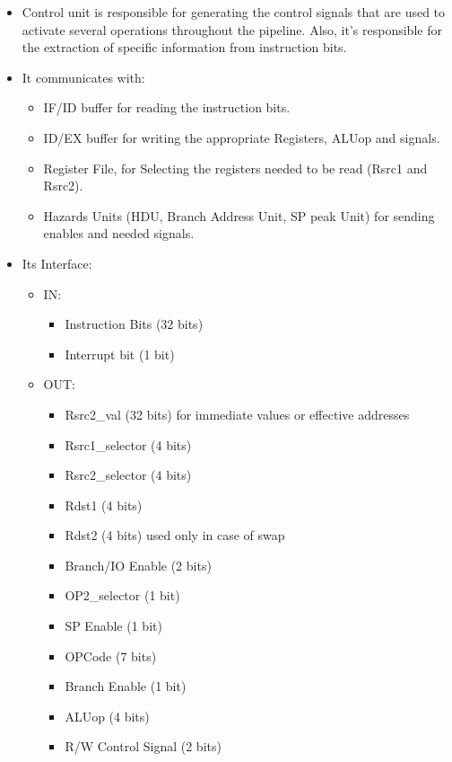 \documentclass[12pt]{report}
\begin{document}
\begin{itemize}
    \item Control unit is responsible for generating the control signals that are used to activate several operations throughout the pipeline. Also, it's responsible for the extraction of specific information from instruction bits.
    
    \item It communicates with:
    \begin{itemize}
        \item IF/ID buffer for reading the instruction bits.
        \item ID/EX buffer for writing the appropriate Registers, ALUop and signals.
        \item Register File, for Selecting the registers needed to be read (Rsrc1 and Rsrc2).
        \item Hazards Units (HDU, Branch Address Unit, SP peak Unit) for sending enables and needed signals.
    \end{itemize}
    
    \item Its Interface:
    \begin{itemize}
        \item IN: 
        \begin{itemize}
            \item Instruction Bits (32 bits)
            \item Interrupt bit (1 bit)
        \end{itemize}
        \item OUT:
        \begin{itemize}
            \item Rsrc2\_val (32 bits) for immediate values or effective addresses
            \item Rsrc1\_selector (4 bits)
            \item Rsrc2\_selector (4 bits)
            \item Rdst1 (4 bits)
            \item Rdst2 (4 bits) used only in case of swap
            \item Branch/IO Enable (2 bits)
            \item OP2\_selector (1 bit)
            \item SP Enable (1 bit)
            \item OPCode (7 bits)
            \item Branch Enable (1 bit)
            \item ALUop (4 bits)
            \item R/W Control Signal (2 bits)
        \end{itemize}
    \end{itemize}
    

\end{itemize}
\end{document}
